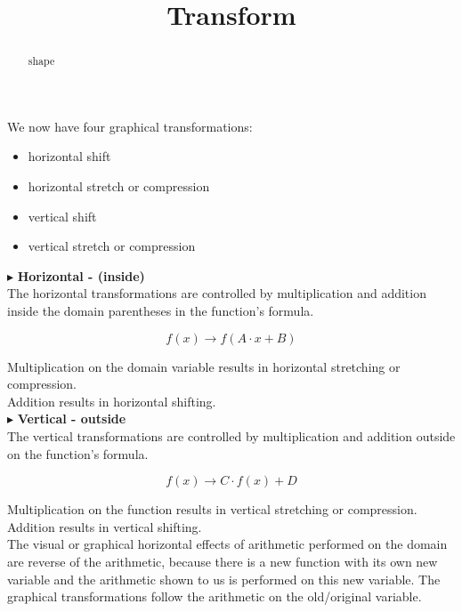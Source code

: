 \documentclass{ximera}
\title{Transform}
\begin{document}
\begin{abstract}
shape
\end{abstract}
\maketitle



We now have four graphical transformations:


\begin{itemize}
\item horizontal shift
\item horizontal stretch or compression
\item vertical shift
\item vertical stretch or compression
\end{itemize}






$\blacktriangleright$  \textbf{\textcolor{purple!85!blue}{Horizontal - (inside)}}  \\


The horizontal transformations are controlled by multiplication and addition inside the domain parentheses in the function's formula.

\[      f(x) \longrightarrow   f(A \cdot x + B)  \]

Multiplication on the domain variable results in horizontal stretching or compression. \\
Addition results in horizontal shifting. \\





$\blacktriangleright$   \textbf{\textcolor{purple!85!blue}{Vertical - outside}}  \\



The vertical transformations are controlled by multiplication and addition outside on the function's formula.

\[      f(x) \longrightarrow   C \cdot f(x) + D \]

Multiplication on the function results in vertical stretching or compression. \\
Addition results in vertical shifting. \\





The visual or graphical horizontal effects of arithmetic performed on the domain are reverse of the arithmetic, because  there is a new function with its own new variable and the arithmetic shown to us is performed on this new variable.  The graphical transformations follow the arithmetic on the old/original variable.
\end{document}
